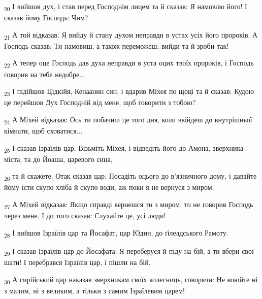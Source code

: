 \begin{tcolorbox}
\textsubscript{20} І вийшов дух, і став перед Господнім лицем та й сказав: Я намовлю його! І сказав йому Господь: Чим?
\end{tcolorbox}
\begin{tcolorbox}
\textsubscript{21} А той відказав: Я вийду й стану духом неправди в устах усіх його пророків. А Господь сказав: Ти намовиш, а також переможеш; вийди та й зроби так!
\end{tcolorbox}
\begin{tcolorbox}
\textsubscript{22} А тепер оце Господь дав духа неправди в уста оцих твоїх пророків, і Господь говорив на тебе недобре...
\end{tcolorbox}
\begin{tcolorbox}
\textsubscript{23} І підійшов Цідкійя, Кенаанин син, і вдарив Міхея по щоці та й сказав: Кудою це перейшов Дух Господній від мене, щоб говорити з тобою?
\end{tcolorbox}
\begin{tcolorbox}
\textsubscript{24} А Міхей відказав: Ось ти побачиш це того дня, коли ввійдеш до внутрішньої кімнати, щоб сховатися...
\end{tcolorbox}
\begin{tcolorbox}
\textsubscript{25} І сказав Ізраїлів цар: Візьміть Міхея, і відведіть його до Амона, зверхника міста, та до Йоаша, царевого сина,
\end{tcolorbox}
\begin{tcolorbox}
\textsubscript{26} та й скажете: Отак сказав цар: Посадіть оцього до в'язничного дому, і давайте йому їсти скупо хліба й скупо води, аж поки я не вернуся з миром.
\end{tcolorbox}
\begin{tcolorbox}
\textsubscript{27} А Міхей відказав: Якщо справді вернешся ти з миром, то не говорив Господь через мене. І до того сказав: Слухайте це, усі люди!
\end{tcolorbox}
\begin{tcolorbox}
\textsubscript{28} І вийшов Ізраїлів цар та Йосафат, цар Юдин, до ґілеадського Рамоту.
\end{tcolorbox}
\begin{tcolorbox}
\textsubscript{29} І сказав Ізраїлів цар до Йосафата: Я переберуся й піду на бій, а ти вбери свої шати! І перебрався Ізраїлів цар, і пішли на бій.
\end{tcolorbox}
\begin{tcolorbox}
\textsubscript{30} А сирійський цар наказав зверхникам своїх колесниць, говорячи: Не воюйте ні з малим, ні з великим, а тільки з самим Ізраїлевим царем!
\end{tcolorbox}
